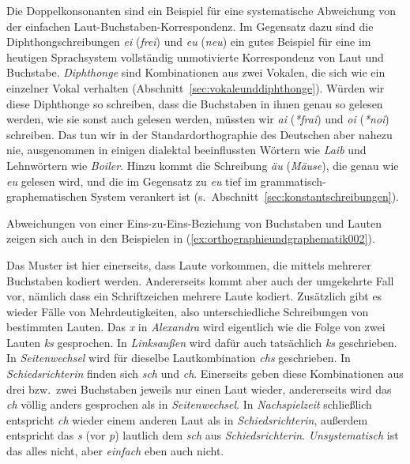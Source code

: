 Die Doppelkonsonanten sind ein Beispiel für eine systematische Abweichung von der einfachen Laut-Buchstaben-Korrespondenz.
Im Gegensatz dazu sind die Diphthongschreibungen \textit{ei} (\textit{frei}) und \textit{eu} (\textit{neu}) ein gutes Beispiel für eine im heutigen Sprachsystem vollständig unmotivierte Korrespondenz von Laut und Buchstabe.
\textit{Diphthonge} sind Kombinationen aus zwei Vokalen, die sich wie ein einzelner Vokal verhalten (Abschnitt~\ref{sec:vokaleunddiphthonge}).
Würden wir diese Diphthonge so schreiben, dass die Buchstaben in ihnen genau so gelesen werden, wie sie sonst auch gelesen werden, müssten wir \textit{ai} (\textit{*frai}) und \textit{oi} (\textit{*noi}) schreiben.
Das tun wir in der Standardorthographie des Deutschen aber nahezu nie, ausgenommen in einigen dialektal beeinflussten Wörtern wie \textit{Laib} und Lehnwörtern wie \textit{Boiler}.
Hinzu kommt die Schreibung \textit{äu} (\textit{Mäuse}), die genau wie \textit{eu} gelesen wird, und die im Gegensatz zu \textit{eu} tief im grammatisch-graphematischen System verankert ist (s.\ Abschnitt~\ref{sec:konstantschreibungen}).

Abweichungen von einer Eins-zu-Eins-Beziehung von Buchstaben und Lauten zeigen sich auch in den Beispielen in (\ref{ex:orthographieundgraphematik002}).

\begin{exe}
  \ex\label{ex:orthographieundgraphematik002}
  \begin{xlist}
  \end{xlist}
\end{exe}

Das Muster ist hier einerseits, dass Laute vorkommen, die mittels mehrerer Buchstaben kodiert werden.
Andererseits kommt aber auch der umgekehrte Fall vor, nämlich dass ein Schriftzeichen mehrere Laute kodiert.
Zusätzlich gibt es wieder Fälle von Mehrdeutigkeiten, also unterschiedliche Schreibungen von bestimmten Lauten.
Das \textit{x} in \textit{Alexandra} wird eigentlich wie die Folge von zwei Lauten \textit{ks} gesprochen.
In \textit{Linksaußen} wird dafür auch tatsächlich \textit{ks} geschrieben.
In \textit{Seitenwechsel} wird für dieselbe Lautkombination \textit{chs} geschrieben.
In \textit{Schiedsrichterin} finden sich \textit{sch} und \textit{ch}.
Einerseits geben diese Kombinationen aus drei bzw.\ zwei Buchstaben jeweils nur einen Laut wieder, andererseits wird das \textit{ch} völlig anders gesprochen als in \textit{Seitenwechsel}.
In \textit{Nachspielzeit} schließlich entspricht \textit{ch} wieder einem anderen Laut als in \textit{Schiedsrichterin}, außerdem entspricht das \textit{s} (vor \textit{p}) lautlich dem \textit{sch} aus \textit{Schiedsrichterin}.
\textit{Unsystematisch} ist das alles nicht, aber \textit{einfach} eben auch nicht.

